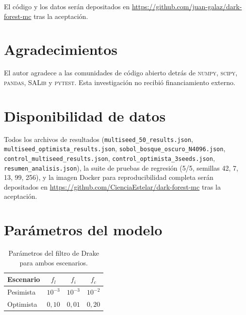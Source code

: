 \documentclass[11pt,a4paper,onecolumn]{article}
\begin{document}
\begin{table}[h]
El código y los datos serán depositados en
\url{https://github.com/juan-galaz/dark-forest-mc}
tras la aceptación.

\section*{Agradecimientos}

El autor agradece a las comunidades de código abierto detrás de
\textsc{numpy}, \textsc{scipy}, \textsc{pandas}, \textsc{SALib}
y \textsc{pytest}.
Esta investigación no recibió financiamiento externo.

\section*{Disponibilidad de datos}

Todos los archivos de resultados
(\texttt{multiseed\_50\_results.json},
\texttt{multiseed\_optimista\_results.json},
\texttt{sobol\_bosque\_oscuro\_N4096.json},
\texttt{control\_multiseed\_results.json},
\texttt{control\_optimista\_3seeds.json},
\texttt{resumen\_analisis.json}), la suite de pruebas de regresión
(5/5, semillas 42, 7, 13, 99, 256), y la imagen Docker para
reproducibilidad completa serán depositados en
\url{https://github.com/CienciaEstelar/dark-forest-mc}
tras la aceptación.

\appendix
\section{Parámetros del modelo}
\label{app:params}

\begin{table}
  \centering
  \caption{Parámetros del filtro de Drake para ambos escenarios.}
  \label{tab:scenarios}
  \begin{tabular}{lccc}
    \toprule
    Escenario & $f_l$ & $f_i$ & $f_c$ \\
    \midrule
    Pesimista & $10^{-3}$ & $10^{-3}$ & $10^{-2}$ \\
    Optimista  & $0{,}10$    & $0{,}01$    & $0{,}20$    \\
    \bottomrule
  \end{tabular}
\end{table}


\end{table}
\end{document}
